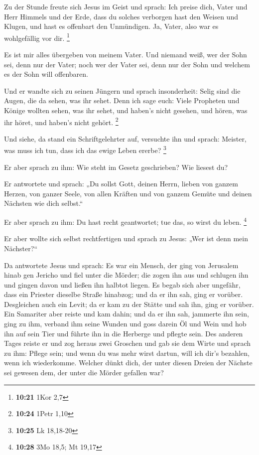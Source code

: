  Zu der Stunde freute sich Jesus im Geist und sprach: Ich
preise dich, Vater und Herr Himmels und der Erde, dass du solches
verborgen hast den Weisen und Klugen, und hast es offenbart den
Unmündigen. Ja, Vater, also war es wohlgefällig vor dir. \footnote{\textbf{10:21}
  1Kor 2,7}

 Es ist mir alles übergeben von meinem Vater. Und niemand
weiß, wer der Sohn sei, denn nur der Vater; noch wer der Vater sei, denn
nur der Sohn und welchem es der Sohn will offenbaren.

 Und er wandte sich zu seinen Jüngern und sprach
insonderheit: Selig sind die Augen, die da sehen, was ihr sehet.
 Denn ich sage euch: Viele Propheten und Könige wollten
sehen, was ihr sehet, und haben's nicht gesehen, und hören, was ihr
höret, und haben's nicht gehört. \footnote{\textbf{10:24} 1Petr 1,10}

 Und siehe, da stand ein Schriftgelehrter auf, versuchte
ihn und sprach: Meister, was muss ich tun, dass ich das ewige Leben
ererbe? \footnote{\textbf{10:25} Lk 18,18-20}

 Er aber sprach zu ihm: Wie steht im Gesetz geschrieben?
Wie liesest du?

 Er antwortete und sprach: „Du sollst Gott, deinen Herrn,
lieben von ganzem Herzen, von ganzer Seele, von allen Kräften und von
ganzem Gemüte und deinen Nächsten wie dich selbst.``

 Er aber sprach zu ihm: Du hast recht geantwortet; tue
das, so wirst du leben. \footnote{\textbf{10:28} 3Mo 18,5; Mt 19,17}

 Er aber wollte sich selbst rechtfertigen und sprach zu
Jesus: „Wer ist denn mein Nächster?{}``

 Da antwortete Jesus und sprach: Es war ein Mensch, der
ging von Jerusalem hinab gen Jericho und fiel unter die Mörder; die
zogen ihn aus und schlugen ihn und gingen davon und ließen ihn halbtot
liegen.  Es begab sich aber ungefähr, dass ein Priester
dieselbe Straße hinabzog; und da er ihn sah, ging er vorüber.
 Desgleichen auch ein Levit; da er kam zu der Stätte und
sah ihn, ging er vorüber.  Ein Samariter aber reiste und
kam dahin; und da er ihn sah, jammerte ihn sein,  ging zu
ihm, verband ihm seine Wunden und goss darein Öl und Wein und hob ihn
auf sein Tier und führte ihn in die Herberge und pflegte sein.
 Des anderen Tages reiste er und zog heraus zwei Groschen
und gab sie dem Wirte und sprach zu ihm: Pflege sein; und wenn du was
mehr wirst dartun, will ich dir's bezahlen, wenn ich wiederkomme.
 Welcher dünkt dich, der unter diesen Dreien der Nächste
sei gewesen dem, der unter die Mörder gefallen war?

